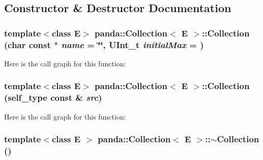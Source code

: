 \subsection{Constructor \& Destructor Documentation}
\hypertarget{classpanda_1_1Collection_a12046f6682c2934a208f3535d44ae56f}{
\subsubsection[{Collection}]{\setlength{\rightskip}{0pt plus 5cm}template$<$class E$>$ {\bf panda::Collection}$<$ E $>$::{\bf Collection} (char const $\ast$ {\em name} = {\ttfamily \char`\"{}\char`\"{}}, \/  UInt\_\-t {\em initialMax} = {})}}
\label{classpanda_1_1Collection_a12046f6682c2934a208f3535d44ae56f}


Here is the call graph for this function:\hypertarget{classpanda_1_1Collection_a065b038d41d0437ddacdab9f22f6d397}{
\subsubsection[{Collection}]{\setlength{\rightskip}{0pt plus 5cm}template$<$class E$>$ {\bf panda::Collection}$<$ E $>$::{\bf Collection} ({\bf self\_\-type} const \& {\em src})}}
\label{classpanda_1_1Collection_a065b038d41d0437ddacdab9f22f6d397}


Here is the call graph for this function:\hypertarget{classpanda_1_1Collection_a4fbdded1eb81d5781265ff4cc9f6197a}{
\subsubsection[{$\sim$Collection}]{\setlength{\rightskip}{0pt plus 5cm}template$<$class E $>$ {\bf panda::Collection}$<$ E $>$::$\sim${\bf Collection} ()}}
\label{classpanda_1_1Collection_a4fbdded1eb81d5781265ff4cc9f6197a}


